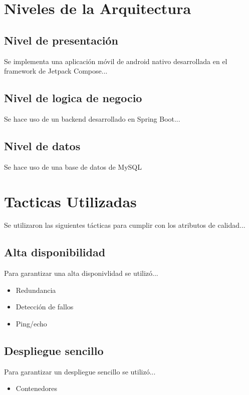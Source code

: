 \documentclass[12pt,a4paper]{article}
\begin{document}
%

\section{Niveles de la Arquitectura}

\subsection{Nivel de presentación}

Se implementa una aplicación móvil de android nativo desarrollada en
el framework de Jetpack Compose...

\subsection{Nivel de logica de negocio}

Se hace uso de un backend desarrollado en Spring Boot...

\subsection{Nivel de datos}

Se hace uso de una base de datos de MySQL

\section{Tacticas Utilizadas}

Se utilizaron las siguientes tácticas para cumplir con los atributos
de calidad...

\subsection{Alta disponibilidad}

Para garantizar una alta disponivlidad se utilizó...

\begin{itemize}
  \item Redundancia
  \item Detección de fallos
  \item Ping/echo
\end{itemize}

\subsection{Despliegue sencillo}

Para garantizar un despliegue sencillo se utilizó...

\begin{itemize}
  \item Contenedores
\end{itemize}
\end{document}
